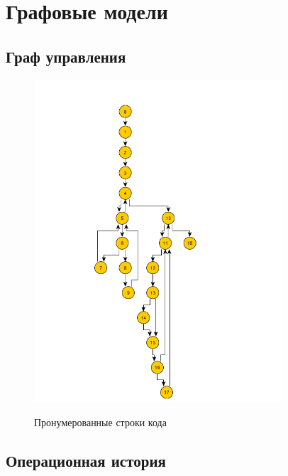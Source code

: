 \documentclass[12pt]{report}
\begin{document}
	\chapter{Графовые модели}
	
	\section{Граф управления}
	
		\begin{figure}[H]	
		{\includegraphics[height = 12cm]{GU.png}}
		\caption{Пронумерованные строки кода}
	\end{figure}

	\section{Операционная история}
	
\end{document}
